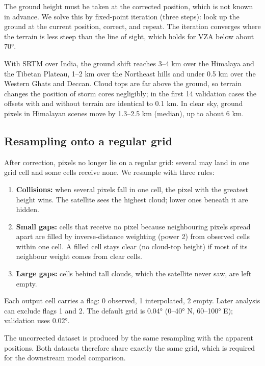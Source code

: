 The ground height must be taken at the corrected position, which is not known in advance. We solve this by fixed-point iteration (three steps): look up the ground at the current position, correct, and repeat. The iteration converges where the terrain is less steep than the line of sight, which holds for VZA below about 70°.

With SRTM over India, the ground shift reaches 3--4 km over the Himalaya and the Tibetan Plateau, 1--2 km over the Northeast hills and under 0.5 km over the Western Ghats and Deccan. Cloud tops are far above the ground, so terrain changes the position of storm cores negligibly; in the first 14 validation cases the offsets with and without terrain are identical to 0.1 km. In clear sky, ground pixels in Himalayan scenes move by 1.3--2.5 km (median), up to about 6 km.

\subsection{Resampling onto a regular grid}\label{sec:3.5}

After correction, pixels no longer lie on a regular grid: several may land in one grid cell and some cells receive none. We resample with three rules:

\begin{enumerate}
\def\labelenumi{\arabic{enumi}.}
\tightlist
\item
  \textbf{Collisions:} when several pixels fall in one cell, the pixel with the greatest height wins. The satellite sees the highest cloud; lower ones beneath it are hidden.
\item
  \textbf{Small gaps:} cells that receive no pixel because neighbouring pixels spread apart are filled by inverse-distance weighting (power 2) from observed cells within one cell. A filled cell stays clear (no cloud-top height) if most of its neighbour weight comes from clear cells.
\item
  \textbf{Large gaps:} cells behind tall clouds, which the satellite never saw, are left empty.
\end{enumerate}

Each output cell carries a flag: 0 observed, 1 interpolated, 2 empty. Later analysis can exclude flags 1 and 2. The default grid is 0.04° (0--40° N, 60--100° E); validation uses 0.02°.

The uncorrected dataset is produced by the same resampling with the apparent positions. Both datasets therefore share exactly the same grid, which is required for the downstream model comparison.

